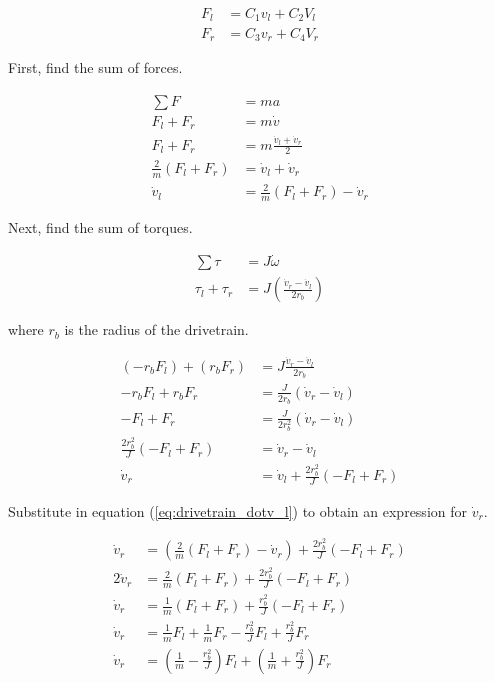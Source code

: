 \begin{align}
  F_l &= C_1 v_l + C_2 V_l \label{eq:drivetrain_Fl} \\
  F_r &= C_3 v_r + C_4 V_r \label{eq:drivetrain_Fr}
\end{align}

First, find the sum of forces.

\begin{align}
  \sum F &= ma \nonumber \\
  F_l + F_r &= m \dot{v} \nonumber \\
  F_l + F_r &= m \frac{\dot{v}_l + \dot{v}_r}{2} \nonumber \\
  \frac{2}{m} (F_l + F_r) &= \dot{v}_l + \dot{v}_r \nonumber \\
  \dot{v}_l &= \frac{2}{m} (F_l + F_r) - \dot{v}_r \label{eq:drivetrain_dotv_l}
\end{align}

Next, find the sum of torques.

\begin{align*}
  \sum \tau &= J \dot{\omega} \\
  \tau_l + \tau_r &= J \left(\frac{\dot{v}_r - \dot{v}_l}{2 r_b}\right)
\end{align*}

where $r_b$ is the radius of the drivetrain.

\begin{align*}
  (-r_b F_l) + (r_b F_r) &= J \frac{\dot{v}_r - \dot{v}_l}{2 r_b} \\
  -r_b F_l + r_b F_r &= \frac{J}{2 r_b} (\dot{v}_r - \dot{v}_l) \\
  -F_l + F_r &= \frac{J}{2 r_b^2} (\dot{v}_r - \dot{v}_l) \\
  \frac{2 r_b^2}{J} (-F_l + F_r) &= \dot{v}_r - \dot{v}_l \\
  \dot{v}_r &= \dot{v}_l + \frac{2 r_b^2}{J} (-F_l + F_r)
\end{align*}

Substitute in equation (\ref{eq:drivetrain_dotv_l}) to obtain an expression for
$\dot{v}_r$.

\begin{align}
  \dot{v}_r &= \left(\frac{2}{m} (F_l + F_r) - \dot{v}_r\right) +
    \frac{2 r_b^2}{J} (-F_l + F_r) \nonumber \\
  2\dot{v}_r &= \frac{2}{m} (F_l + F_r) + \frac{2 r_b^2}{J} (-F_l + F_r)
    \nonumber \\
  \dot{v}_r &= \frac{1}{m} (F_l + F_r) + \frac{r_b^2}{J} (-F_l + F_r)
    \label{eq:drivetrain_vr_2mid} \\
  \dot{v}_r &= \frac{1}{m} F_l + \frac{1}{m} F_r - \frac{r_b^2}{J} F_l +
    \frac{r_b^2}{J} F_r \nonumber \\
  \dot{v}_r &= \left(\frac{1}{m} - \frac{r_b^2}{J}\right) F_l +
    \left(\frac{1}{m} + \frac{r_b^2}{J}\right) F_r \label{eq:drivetrain_vr_2}
\end{align}

